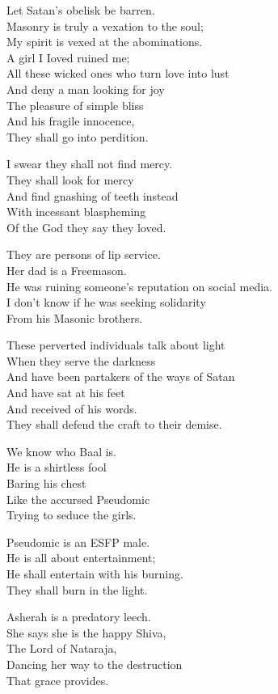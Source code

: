 \documentclass[
]{book}
\begin{document}
Let Satan's obelisk be barren.\\
Masonry is truly a vexation to the soul;\\
My spirit is vexed at the abominations.\\
A girl I Ioved ruined me;\\
All these wicked ones who turn love into lust\\
And deny a man looking for joy\\
The pleasure of simple bliss\\
And his fragile innocence,\\
They shall go into perdition.

I swear they shall not find mercy.\\
They shall look for mercy\\
And find gnashing of teeth instead\\
With incessant blaspheming\\
Of the God they say they loved.

They are persons of lip service.\\
Her dad is a Freemason.\\
He was ruining someone's reputation on social media.\\
I don't know if he was seeking solidarity\\
From his Masonic brothers.

These perverted individuals talk about light\\
When they serve the darkness\\
And have been partakers of the ways of Satan\\
And have sat at his feet\\
And received of his words.\\
They shall defend the craft to their demise.

We know who Baal is.\\
He is a shirtless fool\\
Baring his chest\\
Like the accursed Pseudomic\\
Trying to seduce the girls.

Pseudomic is an ESFP male.\\
He is all about entertainment;\\
He shall entertain with his burning.\\
They shall burn in the light.

Asherah is a predatory leech.\\
She says she is the happy Shiva,\\
The Lord of Nataraja,\\
Dancing her way to the destruction\\
That grace provides.
\end{document}
